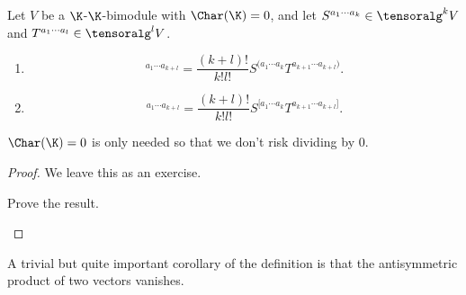 \begin{prp}{}{}
	Let $V$ be a $\K$-$\K$-bimodule with $\Char (\K )=0$, and let $S^{a_1\cdots a_k}\in \tensoralg ^kV$ and $T^{a_1\cdots a_l}\in \tensoralg ^lV$.
	\begin{enumerate}
		\item 
		\begin{equation}
			[S\vee T]^{a_1\cdots a_{k+l}}=\frac{(k+l)!}{k!l!}S^{(a_1\cdots a_k}T^{a_{k+1}\cdots a_{k+l})}.
		\end{equation}
		\item
		\begin{equation}
			[S\wedge T]^{a_1\cdots a_{k+l}}=\frac{(k+l)!}{k!l!}S^{[a_1\cdots a_k}T^{a_{k+1}\cdots a_{k+l}]}.
		\end{equation}
	\end{enumerate}
	\begin{rmk}
		$\Char (\K )=0$ is only needed so that we don't risk dividing by $0$.
	\end{rmk}
	\begin{proof}
		We leave this as an exercise.
		\begin{exr}[breakable=false]{}{}
			Prove the result.
		\end{exr}
	\end{proof}
\end{prp}
A trivial but quite important corollary of the definition is that the antisymmetric product of two vectors vanishes.
